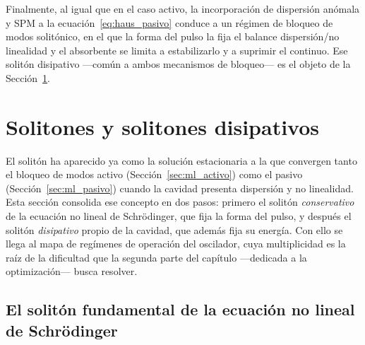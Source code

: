 Finalmente, al igual que en el caso activo, la incorporación de dispersión anómala
y SPM a la ecuación~\eqref{eq:haus_pasivo} conduce a un régimen de bloqueo de modos
solitónico, en el que la forma del pulso la fija el balance dispersión\-/no
linealidad y el absorbente se limita a estabilizarlo y a suprimir el continuo. Ese
solitón disipativo —común a ambos mecanismos de bloqueo— es el objeto de la
Sección~\ref{sec:solitones}.



\section{Solitones y solitones disipativos}
\label{sec:solitones}

El solitón ha aparecido ya como la solución estacionaria a la que convergen tanto
el bloqueo de modos activo (Sección~\ref{sec:ml_activo}) como el pasivo
(Sección~\ref{sec:ml_pasivo}) cuando la cavidad presenta dispersión y no
linealidad. Esta sección consolida ese concepto en dos pasos: primero el solitón
\emph{conservativo} de la ecuación no lineal de Schrödinger, que fija la forma del
pulso, y después el solitón \emph{disipativo} propio de la cavidad, que además fija
su energía. Con ello se llega al mapa de regímenes de operación del oscilador, cuya
multiplicidad es la raíz de la dificultad que la segunda parte del capítulo
—dedicada a la optimización— busca resolver.

\subsection{El solitón fundamental de la ecuación no lineal de Schrödinger}
\label{sec:soliton_fundamental}

